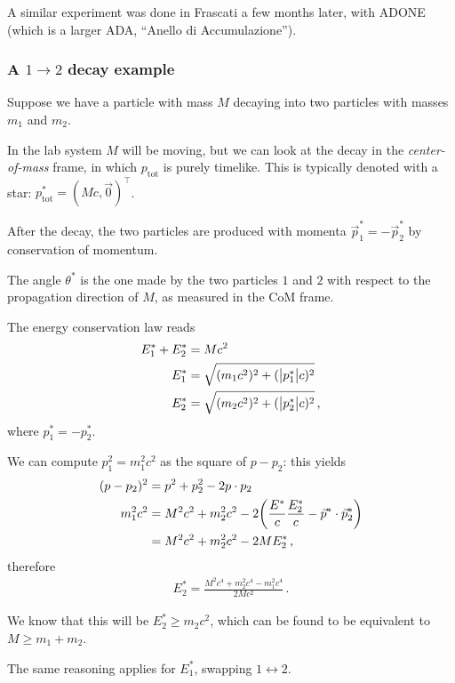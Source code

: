 \documentclass[main.tex]{subfiles}
\begin{document}
A similar experiment was done in Frascati a few months later, with ADONE (which is a larger ADA, ``Anello di Accumulazione'').

\subsubsection{A \(1 \to 2\) decay example}

Suppose we have a particle with mass \(M\) decaying into two particles with masses \(m_1 \) and \(m_2 \). 

In the lab system \(M\) will be moving, but we can look at the decay in the \emph{center-of-mass} frame, in which \(p _{\text{tot}}\) is purely timelike. 
This is typically denoted with a star: \(p^{*} _{\text{tot}} = (M c, \vec{0})^{\top}\). 

After the decay, the two particles are produced with momenta \(\vec{p}^{*}_1 = -\vec{p}^{*}_2\) by conservation of momentum. 

The angle \(\theta^{*}\) is the one made by the two particles \(1\) and \(2\) with respect to the propagation direction of \(M\), as measured in the CoM frame. 

The energy conservation law reads  
%
\begin{align}
E^{*}_{1} + E^{*}_{2} &= Mc^2 \\
E^{*}_{1} &= \sqrt{(m_1 c^2)^2 + (\abs{p^{*}_1} c)^2}\\
E^{*}_{2} &= \sqrt{(m_2 c^2)^2 + (\abs{p^{*}_2} c)^2}
\,,
\end{align}
%
where \(p^{*}_{1} = - p^{*}_{2}\). 

We can compute \(p_1^2 = m_1^2 c^2\) as the square of \(p - p_2 \): this yields 
%
\begin{align}
(p - p_2)^2 &= p^2 + p_2^2 - 2 p \cdot p_2   \\
m_1^2 c^2 &= M^2 c^2 +  m_2^2 c^2 - 2 \qty( \frac{E^{*}}{c} \frac{E^{*}_2}{c} - \vec{p}^{*} \cdot \vec{p}^{*}_{2})  \\
&= M^2c^2 + m_2^2c^2 - 2 M E^{*}_{2}
\,,
\end{align}
%
therefore 
%
\begin{align}
E^{*}_2 = \frac{M^2 c^4 + m_2^2 c^4 - m_1^2 c^4}{2Mc^2}
\,.
\end{align}

We know that this will be \(E^{*}_{2} \geq m_2c^2\), which can be found to be equivalent to \(M \geq m_1 + m_2 \). 

The same reasoning applies for \(E^{*}_{1}\), swapping \(1 \leftrightarrow 2\). 
\end{document}
